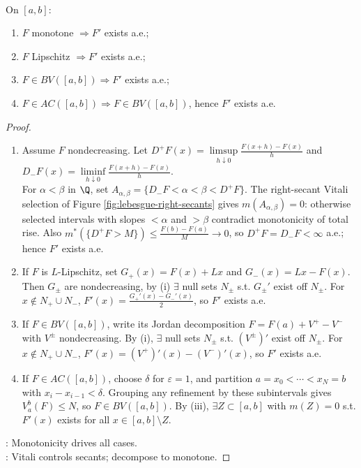 \begin{theorem} \label{thm:lebesgue-last-theorem-and-consequences} \\
On $[a,b]$:
\begin{enumerate}[label=(\roman*)]
\setlength{\itemsep}{0pt}
\item $F$ monotone $\Rightarrow F'$ exists a.e.;
\item $F$ Lipschitz $\Rightarrow F'$ exists a.e.;
\item $F\in BV([a,b])\Rightarrow F'$ exists a.e.;
\item $F\in AC([a,b])\Rightarrow F\in BV([a,b])$, hence $F'$ exists a.e.
\end{enumerate}
\begin{proof}
\begin{enumerate}[label=(\roman*)]
\setlength{\itemsep}{0pt}
\item Assume $F$ nondecreasing. Let $D^+F(x)=\limsup\limits_{h\downarrow0}\frac{F(x+h)-F(x)}h$ and $D_-F(x)=\liminf\limits_{h\downarrow0}\frac{F(x+h)-F(x)}h$.\\
For $\alpha<\beta$ in $\Q$, set $A_{\alpha,\beta}=\{D_-F<\alpha<\beta<D^+F\}$. The right-secant Vitali selection of Figure \ref{fig:lebesgue-right-secants} gives $m(A_{\alpha,\beta})=0$: otherwise selected intervals with slopes $<\alpha$ and $>\beta$ contradict monotonicity of total rise. Also $m^\ast(\{D^+F>M\})\le \frac{F(b)-F(a)}{M}\to0$, so $D^+F=D_-F<\infty$ a.e.; hence $F'$ exists a.e.
\item If $F$ is $L$-Lipschitz, set $G_+(x)=F(x)+Lx$ and $G_-(x)=Lx-F(x)$. Then $G_\pm$ are nondecreasing, by (i) $\exists$ null sets $N_\pm$ s.t. $G_\pm'$ exist off $N_\pm$. For $x\notin N_+\cup N_-$, $F'(x)=\frac{G_+'(x)-G_-'(x)}{2}$, so $F'$ exists a.e.
\item If $F\in BV([a,b])$, write its Jordan decomposition $F=F(a)+V^+-V^-$ with $V^\pm$ nondecreasing. By (i), $\exists$ null sets $N_\pm$ s.t. $(V^\pm)'$ exist off $N_\pm$. For $x\notin N_+\cup N_-$, $F'(x)=(V^+)'(x)-(V^-)'(x)$, so $F'$ exists a.e.
\item If $F\in AC([a,b])$, choose $\delta$ for $\varepsilon=1$, and partition $a=x_0<\cdots<x_N=b$ with $x_i-x_{i-1}<\delta$. Grouping any refinement by these subintervals gives $V_a^b(F)\le N$, so $F\in BV([a,b])$. By (iii), $\exists Z\subset[a,b]$ with $m(Z)=0$ s.t. $F'(x)$ exists for all $x\in[a,b]\setminus Z$.
\end{enumerate}
: Monotonicity drives all cases.\\
: Vitali controls secants; decompose to monotone.
\end{proof}
\end{theorem}
